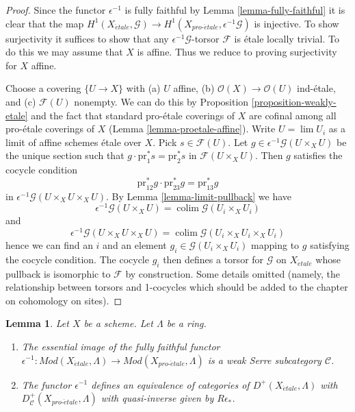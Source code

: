 \documentclass{stacks-project}
\theoremstyle{plain}
\newtheorem{lemma}[subsection]{Lemma}
\theoremstyle{definition}
\theoremstyle{remark}
\numberwithin{equation}{subsection}
\def\lim{\mathop{\mathrm{lim}}\nolimits}
\def\colim{\mathop{\mathrm{colim}}\nolimits}
\def\proetale{{pro\text{-}\acute{e}tale}}
\def\etale{{\acute{e}tale}}
\begin{document}
\begin{proof}
Since the functor $\epsilon^{-1}$ is fully faithful by
Lemma \ref{lemma-fully-faithful}
it is clear that the map
$H^1(X_\etale, \mathcal{G}) \to H^1(X_\proetale, \epsilon^{-1}\mathcal{G})$
is injective. To show surjectivity it suffices to show that
any $\epsilon^{-1}\mathcal{G}$-torsor $\mathcal{F}$ is \'etale
locally trivial. To do this we may assume that $X$ is affine.
Thus we reduce to proving surjectivity for $X$ affine.

\medskip\noindent
Choose a covering $\{U \to X\}$ with (a) $U$ affine, (b)
$\mathcal{O}(X) \to \mathcal{O}(U)$ ind-\'etale, and (c) $\mathcal{F}(U)$
nonempty. We can do this by Proposition \ref{proposition-weakly-etale}
and the fact that
standard pro-\'etale coverings of $X$ are cofinal among all pro-\'etale
coverings of $X$ (Lemma \ref{lemma-proetale-affine}).
Write $U = \lim U_i$ as a limit of affine schemes \'etale over $X$.
Pick $s \in \mathcal{F}(U)$. Let
$g \in \epsilon^{-1}\mathcal{G}(U \times_X U)$
be the unique section such that $g \cdot \text{pr}_1^*s = \text{pr}_2^*s$ in
$\mathcal{F}(U \times_X U)$. Then $g$ satisfies the cocycle condition
$$
\text{pr}_{12}^*g \cdot \text{pr}_{23}^*g = \text{pr}_{13}^*g
$$
in $\epsilon^{-1}\mathcal{G}(U \times_X U \times_X U)$. By
Lemma \ref{lemma-limit-pullback}
we have
$$
\epsilon^{-1}\mathcal{G}(U \times_X U) =
\colim \mathcal{G}(U_i \times_X U_i)
$$
and
$$
\epsilon^{-1}\mathcal{G}(U \times_X U \times_X U) =
\colim \mathcal{G}(U_i \times_X U_i \times_X U_i)
$$
hence we can find an $i$ and an element $g_i \in \mathcal{G}(U_i \times_X U_i)$
mapping to $g$ satisfying the cocycle condition.
The cocycle $g_i$ then defines a torsor for $\mathcal{G}$ on
$X_\etale$ whose pullback is isomorphic to $\mathcal{F}$
by construction. Some details omitted (namely, the relationship
between torsors and 1-cocycles which should be added to the chapter
on cohomology on sites).
\end{proof}

\begin{lemma}
\label{lemma-compare-derived}
Let $X$ be a scheme. Let $\Lambda$ be a ring.
\begin{enumerate}
\item The essential image of the fully faithful functor
$\epsilon^{-1} : \textit{Mod}(X_\etale, \Lambda) \to
\textit{Mod}(X_\proetale, \Lambda)$
is a weak Serre subcategory $\mathcal{C}$.
\item The functor $\epsilon^{-1}$ defines an equivalence of categories
of $D^+(X_\etale, \Lambda)$ with $D^+_\mathcal{C}(X_\proetale, \Lambda)$
with quasi-inverse given by $R\epsilon_*$.
\end{enumerate}
\end{lemma}
\end{document}
